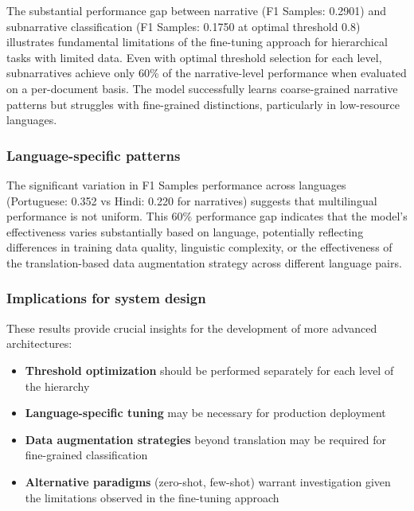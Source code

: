 The substantial performance gap between narrative (F1 Samples: 0.2901) and subnarrative classification (F1 Samples: 0.1750 at optimal threshold 0.8) illustrates fundamental limitations of the fine-tuning approach for hierarchical tasks with limited data. Even with optimal threshold selection for each level, subnarratives achieve only 60\% of the narrative-level performance when evaluated on a per-document basis. The model successfully learns coarse-grained narrative patterns but struggles with fine-grained distinctions, particularly in low-resource languages.

\subsubsection{Language-specific patterns}

The significant variation in F1 Samples performance across languages (Portuguese: 0.352 vs Hindi: 0.220 for narratives) suggests that multilingual performance is not uniform. This 60\% performance gap indicates that the model's effectiveness varies substantially based on language, potentially reflecting differences in training data quality, linguistic complexity, or the effectiveness of the translation-based data augmentation strategy across different language pairs.

\subsubsection{Implications for system design}

These results provide crucial insights for the development of more advanced architectures:

\begin{itemize}
    \item \textbf{Threshold optimization} should be performed separately for each level of the hierarchy
    \item \textbf{Language-specific tuning} may be necessary for production deployment
    \item \textbf{Data augmentation strategies} beyond translation may be required for fine-grained classification
    \item \textbf{Alternative paradigms} (zero-shot, few-shot) warrant investigation given the limitations observed in the fine-tuning approach
\end{itemize}
